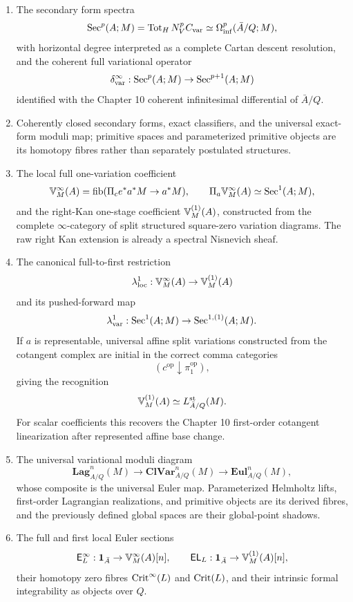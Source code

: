 \begin{theorem}
\begin{enumerate}
\item The secondary form spectra
\[
    \operatorname{Sec}^p(A;M)
    =
    \operatorname{Tot}_HN_V^pC_{\mathrm{var}}
    \simeq
    \Omega_{\mathrm{inf}}^p(\bar A/Q;M),
\]
with horizontal degree interpreted as a complete Cartan descent resolution, and the coherent full variational operator
\[
    \delta^\infty_{\mathrm{var}}:
    \operatorname{Sec}^p(A;M)\to\operatorname{Sec}^{p+1}(A;M)
\]
identified with the Chapter 10 coherent infinitesimal differential of \(\bar A/Q\).

\item Coherently closed secondary forms, exact classifiers, and the universal exact-form moduli map; primitive spaces and parameterized primitive objects are its homotopy fibres rather than separately postulated structures.

\item The local full one-variation coefficient
\[
    \mathbb V^{\infty}_M(A)
    =
    \operatorname{fib}(\Pi_ce^*a^*M\to a^*M),
    \qquad
    \Pi_a\mathbb V^{\infty}_M(A)\simeq\operatorname{Sec}^1(A;M),
\]
and the right-Kan one-stage coefficient \(\mathbb V^{(1)}_M(A)\), constructed from the complete \(\infty\)-category of split structured square-zero variation diagrams. The raw right Kan extension is already a spectral Nisnevich sheaf.

\item The canonical full-to-first restriction
\[
    \lambda^1_{\mathrm{loc}}:\mathbb V^{\infty}_M(A)\to\mathbb V^{(1)}_M(A)
\]
and its pushed-forward map
\[
    \lambda^1_{\mathrm{var}}:
    \operatorname{Sec}^1(A;M)\to\operatorname{Sec}^{1,(1)}(A;M).
\]
If \(a\) is representable, universal affine split variations constructed from the cotangent complex are initial in the correct comma categories
\[
    (c^{\mathrm{op}}\downarrow\pi_1^{\mathrm{op}}),
\]
giving the recognition
\[
    \mathbb V^{(1)}_M(A)
    \simeq
    L^{\mathrm{st}}_{\bar A/Q}(M).
\]
For scalar coefficients this recovers the Chapter 10 first-order cotangent linearization after represented affine base change.

\item The universal variational moduli diagram
\[
    \boxed{
    \mathbf{Lag}^n_{A/Q}(M)
    \longrightarrow
    \mathbf{ClVar}^n_{A/Q}(M)
    \longrightarrow
    \mathbf{Eul}^n_{A/Q}(M),
    }
\]
whose composite is the universal Euler map. Parameterized Helmholtz lifts, first-order Lagrangian realizations, and primitive objects are its derived fibres, and the previously defined global spaces are their global-point shadows.

\item The full and first local Euler sections
\[
    \mathsf E_L^\infty:\mathbf 1_{\bar A}\to\mathbb V^{\infty}_M(A)[n],
    \qquad
    \mathsf{EL}_L:\mathbf 1_{\bar A}\to\mathbb V^{(1)}_M(A)[n],
\]
their homotopy zero fibres \(\operatorname{Crit}^\infty(L)\) and \(\operatorname{Crit}(L)\), and their intrinsic formal integrability as objects over \(Q\).


\end{enumerate}
\end{theorem}
